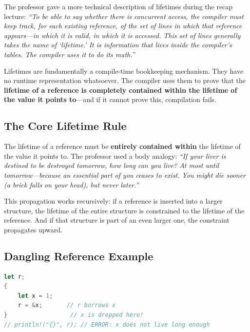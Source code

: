 The professor gave a more technical description of lifetimes during the recap lecture: \emph{``To be able to say whether there is concurrent access, the compiler must keep track, for each existing reference, of the set of lines in which that reference appears---in which it is valid, in which it is accessed. This set of lines generally takes the name of `lifetime.' It is information that lives inside the compiler's tables. The compiler uses it to do its math.''}

Lifetimes are fundamentally a compile-time bookkeeping mechanism. They have no runtime representation whatsoever. The compiler uses them to prove that the \textbf{lifetime of a reference is completely contained within the lifetime of the value it points to}---and if it cannot prove this, compilation fails.

\subsection{The Core Lifetime Rule}

The lifetime of a reference must be \textbf{entirely contained within} the lifetime of the value it points to. The professor used a body analogy: \emph{``If your liver is destined to be destroyed tomorrow, how long can you live? At most until tomorrow---because an essential part of you ceases to exist. You might die sooner (a brick falls on your head), but never later.''}

This propagation works recursively: if a reference is inserted into a larger structure, the lifetime of the entire structure is constrained to the lifetime of the reference. And if that structure is part of an even larger one, the constraint propagates upward.

\subsection{Dangling Reference Example}

\begin{lstlisting}[language=Rust]
let r;
{
    let x = 1;
    r = &x;       // r borrows x
}                  // x is dropped here!
// println!("{}", r); // ERROR: x does not live long enough
\end{lstlisting}

